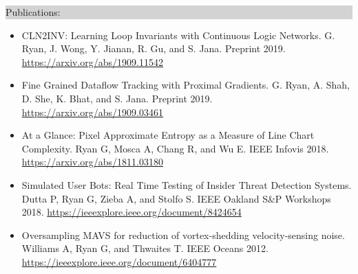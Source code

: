 \documentclass{article} %
\newcommand{\rsection}[1]{
  \hspace{-0.4cm}\vspace{0.1cm}
\colorbox{lightgrey}{
\begin{minipage}{1.07\linewidth}
\vspace{0.22cm}
\fontsize{14pt}{16pt}\selectfont #1 
\vspace{0.12cm}
\end{minipage}
}
\vspace*{-0.1cm}
}
\newcommand{\rjob}[2]{
  \hspace*{-0.3cm}
{\fontsize{10pt}{12pt}\selectfont #1} \hfill #2 
\vspace*{0.1cm} 
\hspace*{-1.2cm}
}
\newenvironment{ritemize}{
\hspace*{-0.8cm} 
\begin{minipage}{1.05\linewidth}
\begin{itemize}
}{
\end{itemize}
\end{minipage}
}
\newcommand{\ritem}{
\item[-]
}
\begin{document}

\rsection{Publications:}

\hspace*{-0.1cm}
\begin{minipage}{1.01\linewidth}
\begin{itemize}[label={},itemindent=-2em,leftmargin=2em, parsep=4pt]
  \item \textrm{\fontsize{11pt}{12pt}\selectfont CLN2INV: Learning Loop Invariants with Continuous Logic Networks.} G. Ryan, J. Wong, Y. Jianan, R. Gu, and S. Jana. Preprint 2019. \url{https://arxiv.org/abs/1909.11542}
  \item \textrm{\fontsize{11pt}{12pt}\selectfont Fine Grained Dataflow Tracking with Proximal Gradients.} G. Ryan, A. Shah, D. She, K. Bhat, and S. Jana. Preprint 2019. \url{https://arxiv.org/abs/1909.03461}
  \item \textrm{\fontsize{11pt}{12pt}\selectfont At a Glance: Pixel Approximate Entropy as a Measure of Line Chart Complexity.} Ryan G, Mosca A, Chang R, and Wu E. IEEE Infovis 2018.  \url{https://arxiv.org/abs/1811.03180}
  \item  \textrm{\fontsize{11pt}{12pt}\selectfont Simulated User Bots: Real Time Testing of Insider Threat Detection Systems.} Dutta P, Ryan G, Zieba A, and Stolfo S. IEEE Oakland S\&P Workshops 2018. \url{https://ieeexplore.ieee.org/document/8424654}
  \item  \textrm{\fontsize{11pt}{12pt}\selectfont Oversampling MAVS for reduction of vortex-shedding velocity-sensing noise.} Williams A, Ryan G, and Thwaites T. IEEE Oceans 2012. \url{https://ieeexplore.ieee.org/document/6404777}
\end{itemize}
\end{minipage}
\end{document}
